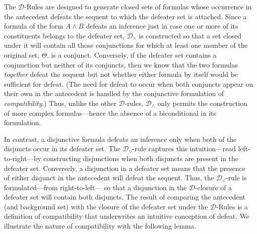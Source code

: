 \documentclass{article}
\theoremstyle{definition}
\theoremstyle{definition}
\theoremstyle{definition}
\theoremstyle{definition}
\theoremstyle{remark}
\theoremstyle{definition}
\theoremstyle{definition}
\begin{document}
The $ \mathcal{D}$-Rules are designed to generate closed sets of formulas whose occurrence in the antecedent defeats the sequent to which the defeater set is attached. Since a formula of the form $ A\wedge B $ defeats an inference just in case one or more of its constituents belongs to the defeater set,  $ \mathcal{D}_{\wedge} $ is constructed so that a set closed under it will contain all those conjunctions for which at least one member of the original set, $ \Theta $, is a conjunct. Conversely, if the defeater set contains a conjunction but neither of its conjuncts, then we know that the two formulas \textit{together} defeat the sequent but not whether either formula by itself would be sufficient for defeat. (The need for defeat to occur when both conjuncts appear on their own in the antecedent is handled by the conjunctive formulation of \textit{compatibility}.) Thus, unlike the other $ \mathcal{D} $-rules, $ \mathcal{D}_{\wedge} $ only permits the construction of more complex formulas---hence the absence of a biconditional in its formulation. 

In contrast, a disjunctive formula defeats an inference only when both of the disjuncts occur in its defeater set.  The $ \mathcal{D}_{\vee}$-rule captures this intuition---read left-to-right---by constructing disjunctions when both disjuncts are present in the defeater set. Conversely, a disjunction in a defeater set means that the presence of either disjunct in the antecedent will defeat the sequent. Thus, the $ \mathcal{D}_{\vee}$-rule is formulated---from right-to-left--- so that a disjunction in the $ \mathcal{D}$-closure of a defeater set will contain both disjuncts. The result of comparing the antecedent (and background set) with the closure of the defeater set under the $ \mathcal{D}$-Rules is a definition of compatibility that underwrites an intuitive conception of defeat. We illustrate the nature of compatibility with the following lemma.
\end{document}
